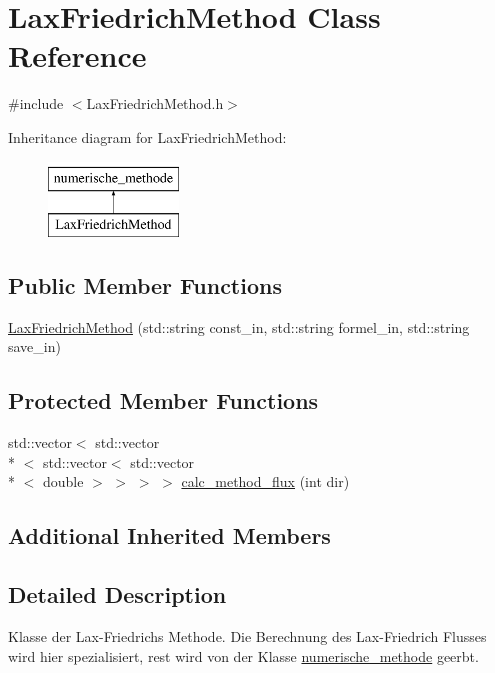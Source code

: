 \hypertarget{classLaxFriedrichMethod}{\section{Lax\-Friedrich\-Method Class Reference}
\label{classLaxFriedrichMethod}
}


{\ttfamily \#include $<$Lax\-Friedrich\-Method.\-h$>$}

Inheritance diagram for Lax\-Friedrich\-Method\-:\begin{figure}[H]
\begin{center}
\leavevmode
\includegraphics[height=2.000000cm]{classLaxFriedrichMethod}
\end{center}
\end{figure}
\subsection*{Public Member Functions}
\begin{DoxyCompactItemize}
\item 
\hyperlink{classLaxFriedrichMethod_abfe41ba9eae1ef560cc5a21bf042f7e9}{Lax\-Friedrich\-Method} (std\-::string const\-\_\-in, std\-::string formel\-\_\-in, std\-::string save\-\_\-in)
\end{DoxyCompactItemize}
\subsection*{Protected Member Functions}
\begin{DoxyCompactItemize}
\item 
std\-::vector$<$ std\-::vector\\*
$<$ std\-::vector$<$ std\-::vector\\*
$<$ double $>$ $>$ $>$ $>$ \hyperlink{classLaxFriedrichMethod_adce098f2eeca3bc185f0f316113abd4b}{calc\-\_\-method\-\_\-flux} (int dir)
\end{DoxyCompactItemize}
\subsection*{Additional Inherited Members}


\subsection{Detailed Description}
Klasse der Lax-\/\-Friedrichs Methode. Die Berechnung des Lax-\/\-Friedrich Flusses wird hier spezialisiert, rest wird von der Klasse \hyperlink{classnumerische__methode}{numerische\-\_\-methode} geerbt. 


